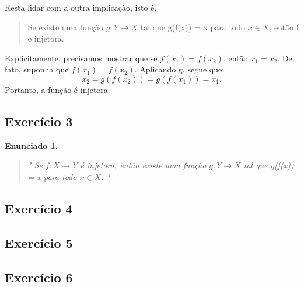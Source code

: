 \documentclass{article}
\newtheorem*{exercise*}{Enunciado}
\begin{document}
    Resta lidar com a outra implica\c c\~ao, isto \'e,
    \begin{quote}
        Se existe uma fun\c c\~ao $g:Y\rightarrow{X}$ tal que g(f(x)) = x para todo $x\in{X}$, 
        ent\~ao f \'e injetora.
    \end{quote}
    Explicitamente, precisamos mostrar que se $f(x_1) = f(x_2)$, ent\~ao $x_1 = x_2$. De fato,
    suponha que $f(x_1) = f(x_2)$. Aplicando g, segue que:
    $$
        x_2 = g(f(x_2)) = g(f(x_1)) = x_1.
    $$
    Portanto, a fun\c c\~ao \'e injetora.
    \qedsymbol
    
    \subsection{Exerc\'icio 3}
    \begin{exercise*}
        \begin{quote}"
            Se $f:X\rightarrow{Y}$ \'e injetora, ent\~ao
            existe uma fun\c c\~ao $g:Y\rightarrow{X}$ tal que g(f(x)) = x para todo $x\in{X}$.            
        "\end{quote}
    \end{exercise*}

    \subsection{Exerc\'icio 4}
    \subsection{Exerc\'icio 5}
    \subsection{Exerc\'icio 6}
\end{document}
